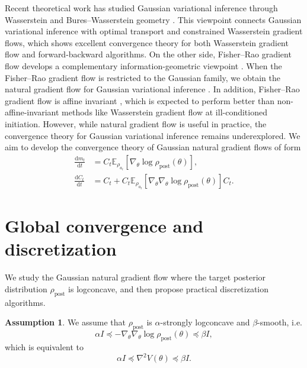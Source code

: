 \documentclass[11pt]{article}
\theoremstyle{plain}
\theoremstyle{definition}
\newtheorem{assumption}[theorem]{Assumption}
\theoremstyle{remark}
\newcommand{\E}{\mathbb{E}}
\newcommand{\post}{\mathrm{post}}
\newcommand{\dd}{\mathrm{d}}
\begin{document}
Recent theoretical work has studied Gaussian variational inference through Wasserstein and Bures--Wasserstein geometry \cite{lambert2022variational, diao2023forward}. This viewpoint connects Gaussian variational inference with optimal transport and constrained Wasserstein gradient flows, which shows excellent convergence theory for both Wasserstein gradient flow and forward-backward algorithms. On the other side, Fisher--Rao gradient flow \cite{carrillo2026fisher} develops a complementary information-geometric viewpoint \cite{amari2016information}. When the Fisher--Rao gradient flow is restricted to the Gaussian family, we obtain the natural gradient flow \cite{amari1998natural} for Gaussian variational inference \cite{chen2023sampling}. In addition, Fisher--Rao gradient flow is affine invariant \cite{chen2023sampling}, which is expected to perform better than non-affine-invariant methods like Wasserstein gradient flow at ill-conditioned initiation. However, while natural gradient flow is useful in practice, the convergence theory for Gaussian variational inference remains underexplored. We aim to develop the convergence theory of Gaussian natural gradient flows of form
\begin{equation}\label{ODEs:NG}
    \begin{aligned}
        \frac{\dd m_t}{\dd t} &= C_t\E_{\rho_{a_t}}[\nabla_\theta \log \rho_{\post}(\theta)], \\
        \frac{\dd C_t}{\dd t} &= C_t + C_t \E_{\rho_{a_t}}[\nabla_\theta \nabla_\theta \log \rho_{\post}(\theta)] C_t.
    \end{aligned}
\end{equation}

\section{Global convergence and discretization}

We study the Gaussian natural gradient flow where the target posterior distribution $\rho_\post$ is logconcave, and then propose practical discretization algorithms.

\begin{assumption}\label{assump:logconcave-smooth}
    We assume that $\rho_\post$ is $\alpha$-strongly logconcave and $\beta$-smooth, i.e.
    \begin{equation*}
        \alpha I \preceq -\nabla_\theta \nabla_\theta \log \rho_\post (\theta) \preceq \beta I,
    \end{equation*}
    which is equivalent to 
    \begin{equation*}
        \alpha I \preceq \nabla^2 V(\theta) \preceq \beta I.
    \end{equation*}
\end{assumption}
\end{document}
